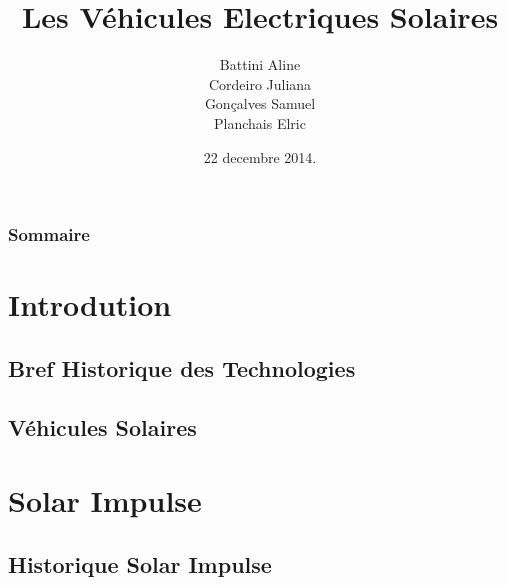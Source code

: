 \documentclass{beamer}
\title[Les Véhicules Electriques Solaires]{Les Véhicules Electriques Solaires} %
\author{
Battini Aline\\
Cordeiro Juliana\\
Gonçalves Samuel\\
Planchais Elric} %
\institute[UTC] %
{
Université de Technologie de Compiègne \\ %
\medskip
\textit{BA04} %
}
\date{22 decembre 2014.} %
\begin{document}
\begin{frame}
\titlepage %
\end{frame}

\begin{frame}
\frametitle{Sommaire} %
\tableofcontents %
\end{frame}


\section{Introdution} %

\subsection{Bref Historique des Technologies} %

\subsection{Véhicules Solaires}
\section{Solar Impulse}
\subsection{Historique Solar Impulse}
\end{document}
